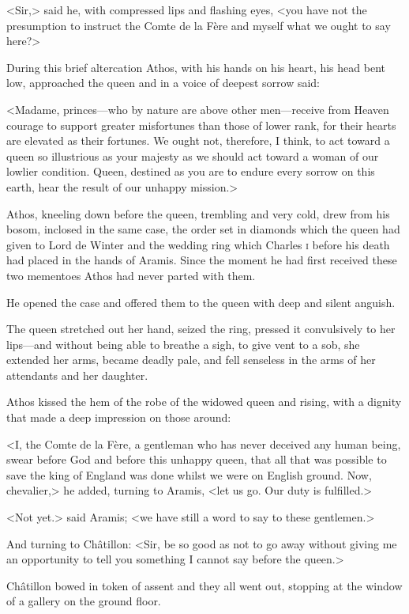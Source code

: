 <Sir,> said he, with compressed lips and flashing eyes, <you have not the presumption to instruct the Comte de la Fère and myself what we ought to say here?>

During this brief altercation Athos, with his hands on his heart, his head bent low, approached the queen and in a voice of deepest sorrow said:

<Madame, princes—who by nature are above other men—receive from Heaven courage to support greater misfortunes than those of lower rank, for their hearts are elevated as their fortunes. We ought not, therefore, I think, to act toward a queen so illustrious as your majesty as we should act toward a woman of our lowlier condition. Queen, destined as you are to endure every sorrow on this earth, hear the result of our unhappy mission.>

Athos, kneeling down before the queen, trembling and very cold, drew from his bosom, inclosed in the same case, the order set in diamonds which the queen had given to Lord de Winter and the wedding ring which Charles \textsc{i}  before his death had placed in the hands of Aramis. Since the moment he had first received these two mementoes Athos had never parted with them.

He opened the case and offered them to the queen with deep and silent anguish.

The queen stretched out her hand, seized the ring, pressed it convulsively to her lips—and without being able to breathe a sigh, to give vent to a sob, she extended her arms, became deadly pale, and fell senseless in the arms of her attendants and her daughter.

Athos kissed the hem of the robe of the widowed queen and rising, with a dignity that made a deep impression on those around:

<I, the Comte de la Fère, a gentleman who has never deceived any human being, swear before God and before this unhappy queen, that all that was possible to save the king of England was done whilst we were on English ground. Now, chevalier,> he added, turning to Aramis, <let us go. Our duty is fulfilled.>

<Not yet.> said Aramis; <we have still a word to say to these gentlemen.>

And turning to Châtillon: <Sir, be so good as not to go away without giving me an opportunity to tell you something I cannot say before the queen.>

Châtillon bowed in token of assent and they all went out, stopping at the window of a gallery on the ground floor.

